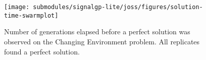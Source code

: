 \begin{figure}[h]

\centering
\texttt{[image: submodules/signalgp-lite/joss/figures/solution-time-swarmplot]}

\caption{%
Number of generations elapsed before a perfect solution was observed on the Changing Environment problem.
All replicates found a perfect solution.
} \label{fig:tts-changing}

\end{figure}

